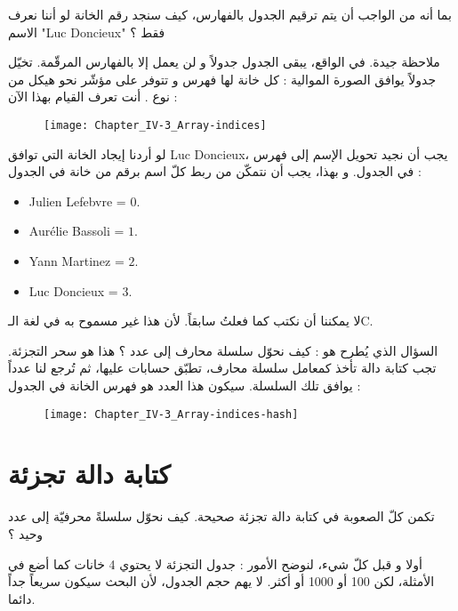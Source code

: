 \begin{question}
بما أنه من الواجب أن يتم ترقيم الجدول بالفهارس، كيف سنجد رقم الخانة لو أننا نعرف الاسم
"\textenglish{Luc Doncieux}"
 فقط ؟
\end{question}

ملاحظة جيدة. في الواقع، يبقى الجدول جدولاً و لن يعمل إلا بالفهارس المرقّمة. تخيّل جدولاً يوافق الصورة الموالية : كل خانة لها فهرس و تتوفر على مؤشّر نحو هيكل من نوع
.
أنت تعرف القيام بهذا الآن :

\begin{figure}[H]
	\centering
	\texttt{[image: Chapter\_IV-3\_Array-indices]}
\end{figure}

 لو أردنا إيجاد الخانة التي توافق
\textenglish{Luc Doncieux}،
 يجب أن نجيد تحويل الإسم إلى فهرس في الجدول. و بهذا، يجب أن نتمكّن من ربط كلّ اسم برقم من خانة في الجدول :

\begin{itemize}
	\item \textenglish{Julien Lefebvre} = $0$.
	\item \textenglish{Aurélie Bassoli} = $1$.
	\item \textenglish{Yann Martinez} = $2$.
	\item \textenglish{Luc Doncieux} = $3$.
\end{itemize}

لا يمكننا أن نكتب
كما فعلتُ سابقاً. لأن هذا غير مسموح به في لغة الـ\textenglish{C}.

السؤال الذي يُطرح هو : كيف نحوّل سلسلة محارف إلى عدد ؟ هذا هو سحر التجزئة. تجب كتابة دالة تأخذ كمعامل سلسلة محارف، تطبّق حسابات عليها، ثم تُرجع لنا عدداً يوافق تلك السلسلة. سيكون هذا العدد هو فهرس الخانة في الجدول :

\begin{figure}[H]
	\centering
	\texttt{[image: Chapter\_IV-3\_Array-indices-hash]}
\end{figure}

\section{كتابة دالة تجزئة}

تكمن كلّ الصعوبة في كتابة دالة تجزئة صحيحة. كيف نحوّل سلسلةً محرفيّة إلى عدد وحيد ؟

أولا و قبل كلّ شيء، لنوضح الأمور : جدول التجزئة لا يحتوي 4 خانات كما أضع في الأمثلة، لكن 100 أو 1000 أو أكثر. لا يهم حجم الجدول، لأن البحث سيكون سريعاً جداً دائما.

